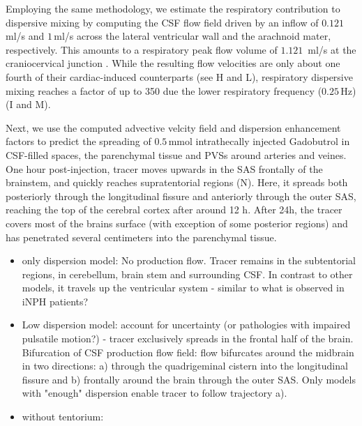 \documentclass[fleqn,10pt]{wlscirep}
\begin{document}
Employing the same methodology, we estimate the respiratory contribution to dispersive mixing by computing the CSF flow field driven by an inflow of $0.121\,$ml/s \cite{liu2024using} and $1\,$ml/s across the lateral ventricular wall and the arachnoid mater, respectively. This amounts to a respiratory peak flow volume of $1.121\,$ ml/s at the craniocervical junction \cite{gutierrez2022effect}. While the resulting flow velocities are only about one fourth of their cardiac-induced counterparts (see H and L), respiratory dispersive mixing reaches a factor of up to 350 due the lower respiratory frequency ($0.25\,$Hz) (I and M).


Next, we use the computed advective velcity field and dispersion enhancement factors to predict the spreading of $0.5\,$mmol intrathecally injected Gadobutrol in CSF-filled spaces, the parenchymal tissue and PVSs around arteries and veines. One hour post-injection, tracer moves upwards in the SAS frontally of the brainstem,  and quickly reaches supratentorial regions (N). Here, it spreads both posteriorly through the longitudinal fissure and anteriorly through the outer SAS, reaching the top of the cerebral cortex after around 12 h. After 24h, the tracer covers most of the brains surface (with exception of some posterior regions) and has penetrated several centimeters into the parenchymal tissue.



\begin{itemize}
    \item only dispersion model: No production flow. Tracer remains in the subtentorial regions, in cerebellum, brain stem and surrounding CSF. In contrast to other models, it travels up the ventricular system - similar to what is observed in iNPH patients?
    \item Low dispersion model: account for uncertainty (or pathologies with impaired pulsatile motion?) - tracer exclusively spreads in the frontal half of the brain. Bifurcation of CSF production flow field: flow bifurcates around the midbrain in two directions: a) through the quadrigeminal cistern into the longitudinal fissure and b) frontally around the brain through the outer SAS. Only models with "enough" dispersion enable tracer to follow trajectory a).
    \item without tentorium: 
\end{itemize}
\end{document}
